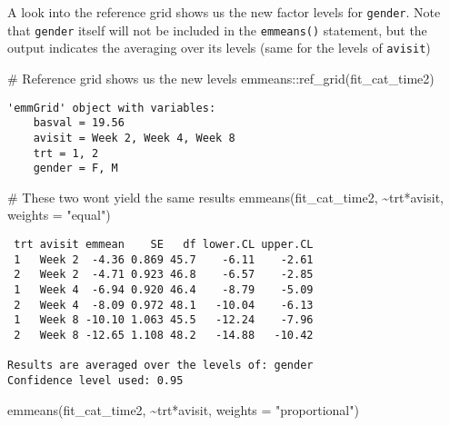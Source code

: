 \documentclass[
  letterpaper,
  DIV=11,
  numbers=noendperiod]{scrreprt}
\newenvironment{Shaded}{\begin{snugshade}}{\end{snugshade}}
\newcommand{\AttributeTok}[1]{\textcolor[rgb]{0.40,0.45,0.13}{#1}}
\newcommand{\CommentTok}[1]{\textcolor[rgb]{0.37,0.37,0.37}{#1}}
\newcommand{\FunctionTok}[1]{\textcolor[rgb]{0.28,0.35,0.67}{#1}}
\newcommand{\NormalTok}[1]{\textcolor[rgb]{0.00,0.23,0.31}{#1}}
\newcommand{\SpecialCharTok}[1]{\textcolor[rgb]{0.37,0.37,0.37}{#1}}
\newcommand{\StringTok}[1]{\textcolor[rgb]{0.13,0.47,0.30}{#1}}
\begin{document}
A look into the reference grid shows us the new factor levels for
\texttt{gender}. Note that \texttt{gender} itself will not be included
in the \texttt{emmeans()} statement, but the output indicates the
averaging over its levels (same for the levels of \texttt{avisit})

\begin{Shaded}
\begin{Highlighting}[]
\CommentTok{\# Reference grid shows us the new levels}
\NormalTok{emmeans}\SpecialCharTok{::}\FunctionTok{ref\_grid}\NormalTok{(fit\_cat\_time2)}
\end{Highlighting}
\end{Shaded}

\begin{verbatim}
'emmGrid' object with variables:
    basval = 19.56
    avisit = Week 2, Week 4, Week 8
    trt = 1, 2
    gender = F, M
\end{verbatim}

\begin{Shaded}
\begin{Highlighting}[]
\CommentTok{\# These two won\textquotesingle{}t yield the same results}
\FunctionTok{emmeans}\NormalTok{(fit\_cat\_time2, }\SpecialCharTok{\textasciitilde{}}\NormalTok{trt}\SpecialCharTok{*}\NormalTok{avisit, }\AttributeTok{weights =} \StringTok{"equal"}\NormalTok{)}
\end{Highlighting}
\end{Shaded}

\begin{verbatim}
 trt avisit emmean    SE   df lower.CL upper.CL
 1   Week 2  -4.36 0.869 45.7    -6.11    -2.61
 2   Week 2  -4.71 0.923 46.8    -6.57    -2.85
 1   Week 4  -6.94 0.920 46.4    -8.79    -5.09
 2   Week 4  -8.09 0.972 48.1   -10.04    -6.13
 1   Week 8 -10.10 1.063 45.5   -12.24    -7.96
 2   Week 8 -12.65 1.108 48.2   -14.88   -10.42

Results are averaged over the levels of: gender 
Confidence level used: 0.95 
\end{verbatim}

\begin{Shaded}
\begin{Highlighting}[]
\FunctionTok{emmeans}\NormalTok{(fit\_cat\_time2, }\SpecialCharTok{\textasciitilde{}}\NormalTok{trt}\SpecialCharTok{*}\NormalTok{avisit, }\AttributeTok{weights =} \StringTok{"proportional"}\NormalTok{)}
\end{Highlighting}
\end{Shaded}
\end{document}
